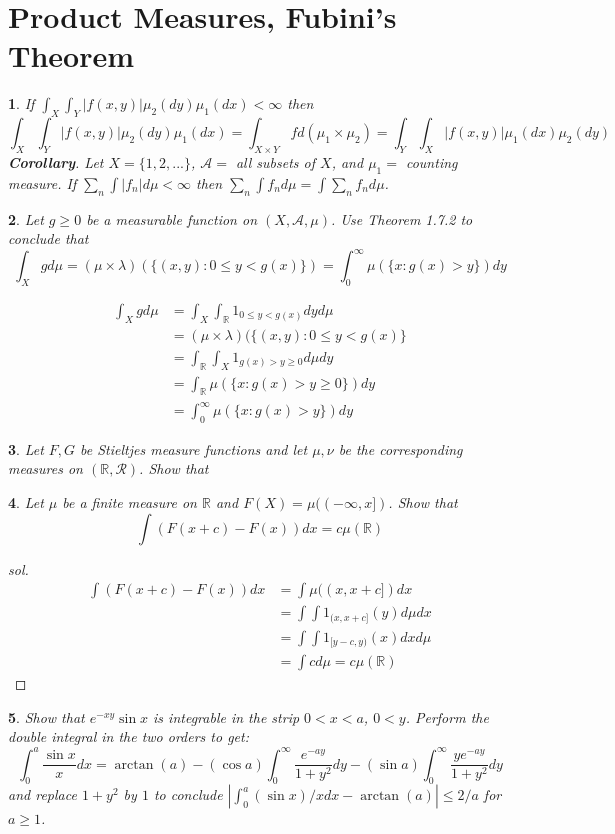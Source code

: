\documentclass{report}
\newtheorem{ex}{}[section]
\begin{document}
\section{Product Measures, Fubini's Theorem}
\begin{ex}
If $\int_X\int_Y |f(x,y)|\mu_2(dy)\mu_1(dx) < \infty$ then
\[\int_X\int_Y |f(x,y)|\mu_2(dy)\mu_1(dx) = \int_{X\times Y}fd(\mu_1 \times \mu_2) =\int_Y\int_X |f(x,y)|\mu_1(dx)\mu_2(dy)\]
{\bf{Corollary}}. Let $X = \{1,2,...\}$, $\mathcal{A} = $ all subsets of $X$, and $\mu_1 = $ counting measure. If $\sum_n\int |f_n|d\mu < \infty$ then $\sum_n \int f_nd\mu = \int\sum_n f_nd\mu$.
\end{ex}
\begin{ex}
Let $g \ge 0$ be a measurable function on $(X,\mathcal{A},\mu)$. Use Theorem 1.7.2 to conclude that
\[\int_X gd\mu = (\mu \times \lambda)(\{(x,y) : 0 \le y < g(x)\}) = \int_0^\infty \mu(\{x : g(x) > y\})dy\]
\end{ex}
\begin{align*}
    \int_X gd\mu &= \int_X\int_\mathbb{R} 1_{0 \le y < g(x)}dyd\mu\\
    &= (\mu \times \lambda) (\{(x,y) : 0 \le y < g(x)\}\\
    &= \int_\mathbb{R}\int_X 1_{g(x) > y \ge 0}d\mu dy\\
    &= \int_\mathbb{R} \mu(\{x : g(x) > y \ge 0\})dy\\
    &= \int_0^\infty \mu(\{x : g(x) > y\})dy
\end{align*}
\begin{ex}
Let  $F, G$ be Stieltjes measure functions and let $\mu, \nu$ be the corresponding measures on $(\mathbb{R}, \mathcal{R})$. Show that
\end{ex}
\begin{ex}
Let $\mu$ be a finite measure on $\mathbb{R}$ and $F(X) = \mu((-\infty, x])$. Show that
\[\int (F(x+c) - F(x)) dx = c\mu(\mathbb{R})\]
\end{ex}
\begin{proof}[sol]
\begin{align*}
    \int (F(x+c) - F(x))dx &= \int \mu((x,x+c])dx\\
    &=\int\int 1_{(x,x+c]}(y) d\mu dx\\
    &=\int\int 1_{[y-c,y)}(x) dx d\mu\\
    &= \int cd\mu = c\mu(\mathbb{R})
\end{align*}
\end{proof}
\begin{ex}
Show that $e^{-xy}\sin x$ is integrable in the strip $0 < x < a$, $0 < y$. Perform the double integral in the two orders to get:
\[\int_0^a \frac{\sin x}{x}dx = \arctan(a) - (\cos a)\int_0^\infty \frac{e^{-ay}}{1+y^2}dy - (\sin a)\int_0^\infty \frac{ye^{-ay}}{1+y^2}dy\]
and replace $1+y^2$ by $1$ to conclude $|\int_0^a (\sin x)/x dx - \arctan(a)| \le 2/a$ for $a \ge 1$. 
\end{ex}
\end{document}
